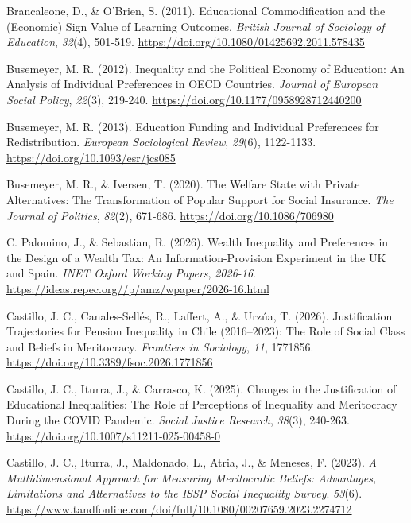 \documentclass[
  spanish,
  a4paper,
  oneside]{scrbook}
\newlength{\cslhangindent}
\newenvironment{CSLReferences}[2] %
 {\begin{list}{}{%
  \setlength{\itemindent}{0pt}
  \setlength{\leftmargin}{0pt}
  \setlength{\parsep}{0pt}
  \ifodd #1
   \setlength{\leftmargin}{\cslhangindent}
   \setlength{\itemindent}{-1\cslhangindent}
  \fi
  \setlength{\itemsep}{#2\baselineskip}}}
 {\end{list}}
\begin{document}
\begin{CSLReferences}{1}{0}
Brancaleone, D., \& O'Brien, S. (2011). Educational Commodification and
the (Economic) Sign Value of Learning Outcomes. \emph{British Journal of
Sociology of Education}, \emph{32}(4), 501-519.
\url{https://doi.org/10.1080/01425692.2011.578435}

Busemeyer, M. R. (2012). Inequality and the Political Economy of
Education: An Analysis of Individual Preferences in OECD Countries.
\emph{Journal of European Social Policy}, \emph{22}(3), 219-240.
\url{https://doi.org/10.1177/0958928712440200}

Busemeyer, M. R. (2013). Education Funding and Individual Preferences
for Redistribution. \emph{European Sociological Review}, \emph{29}(6),
1122-1133. \url{https://doi.org/10.1093/esr/jcs085}

Busemeyer, M. R., \& Iversen, T. (2020). The Welfare State with Private
Alternatives: The Transformation of Popular Support for Social
Insurance. \emph{The Journal of Politics}, \emph{82}(2), 671-686.
\url{https://doi.org/10.1086/706980}

C. Palomino, J., \& Sebastian, R. (2026). Wealth Inequality and
Preferences in the Design of a Wealth Tax: An Information-Provision
Experiment in the UK and Spain. \emph{INET Oxford Working Papers},
\emph{2026-16}. \url{https://ideas.repec.org//p/amz/wpaper/2026-16.html}

Castillo, J. C., Canales-Sellés, R., Laffert, A., \& Urzúa, T. (2026).
Justification Trajectories for Pension Inequality in Chile (2016--2023):
The Role of Social Class and Beliefs in Meritocracy. \emph{Frontiers in
Sociology}, \emph{11}, 1771856.
\url{https://doi.org/10.3389/fsoc.2026.1771856}

Castillo, J. C., Iturra, J., \& Carrasco, K. (2025). Changes in the
Justification of Educational Inequalities: The Role of Perceptions of
Inequality and Meritocracy During the COVID Pandemic. \emph{Social
Justice Research}, \emph{38}(3), 240-263.
\url{https://doi.org/10.1007/s11211-025-00458-0}

Castillo, J. C., Iturra, J., Maldonado, L., Atria, J., \& Meneses, F.
(2023). \emph{A Multidimensional Approach for Measuring Meritocratic
Beliefs: Advantages, Limitations and Alternatives to the ISSP Social
Inequality Survey}. \emph{53}(6).
\url{https://www.tandfonline.com/doi/full/10.1080/00207659.2023.2274712}


\end{CSLReferences}
\end{document}
